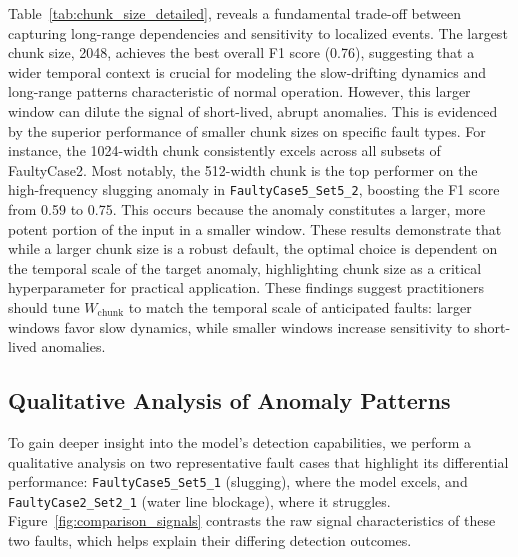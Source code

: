 \documentclass{article}
\begin{document}
Table~\ref{tab:chunk_size_detailed}, reveals a fundamental trade-off between capturing long-range dependencies and sensitivity to localized events. The largest chunk size, 2048, achieves the best overall F1 score (0.76), suggesting that a wider temporal context is crucial for modeling the slow-drifting dynamics and long-range patterns characteristic of normal operation. However, this larger window can dilute the signal of short-lived, abrupt anomalies. This is evidenced by the superior performance of smaller chunk sizes on specific fault types. For instance, the 1024-width chunk consistently excels across all subsets of FaultyCase2. Most notably, the 512-width chunk is the top performer on the high-frequency slugging anomaly in \texttt{FaultyCase5\_Set5\_2}, boosting the F1 score from 0.59 to 0.75. This occurs because the anomaly constitutes a larger, more potent portion of the input in a smaller window. These results demonstrate that while a larger chunk size is a robust default, the optimal choice is dependent on the temporal scale of the target anomaly, highlighting chunk size as a critical hyperparameter for practical application.
These findings suggest practitioners should tune $W_{\text{chunk}}$ to match the temporal scale of anticipated faults: larger windows favor slow dynamics, while smaller windows increase sensitivity to short-lived anomalies.


\subsection{Qualitative Analysis of Anomaly Patterns}\label{sec:qualitative_analysis}

To gain deeper insight into the model's detection capabilities, we perform a qualitative analysis on two representative fault cases that highlight its differential performance: \texttt{FaultyCase5\_Set5\_1} (slugging), where the model excels, and \texttt{FaultyCase2\_Set2\_1} (water line blockage), where it struggles. Figure~\ref{fig:comparison_signals} contrasts the raw signal characteristics of these two faults, which helps explain their differing detection outcomes.
\end{document}
